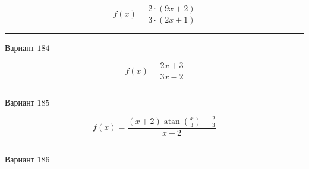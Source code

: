 \documentclass[11pt]{report}
\begin{document}
                                                                                                                                                                                                                                                                                                                                                                                                                                                                                                                                                                                                                                                                                                                                                                                                                                                                                                                                                                                                                                                                                                                                                                                                                                                                                                                                                                                                                                                                                                                                                                                                                                                                                                                                                                                                                                                             

$$f(x) = \frac{2 \cdot \left(9 x + 2\right)}{3 \cdot \left(2 x + 1\right)}$$
\begin{center}
\noindent\rule{8cm}{0.4pt}
\end{center}
Вариант $184$


$$f(x) = \frac{2 x + 3}{3 x - 2}$$
\begin{center}
\noindent\rule{8cm}{0.4pt}
\end{center}
Вариант $185$


$$f(x) = \frac{\left(x + 2\right) \operatorname{atan}{\left(\frac{x}{3} \right)} - \frac{2}{3}}{x + 2}$$
\begin{center}
\noindent\rule{8cm}{0.4pt}
\end{center}
Вариант $186$
\end{document}
